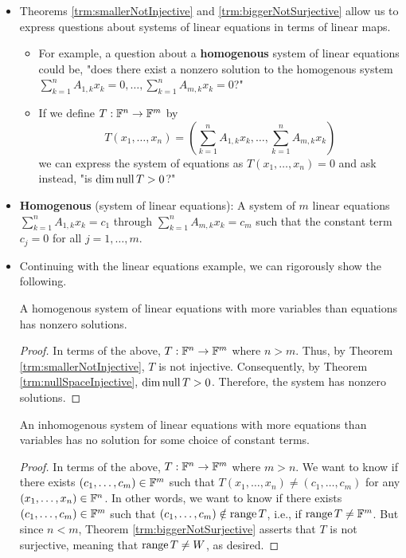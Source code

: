 \documentclass[../main.tex]{subfiles}
\begin{document}
\begin{itemize}
\begin{theorem}
\begin{proof}
        \end{proof}
    \end{theorem}
    \item Theorems \ref{trm:smallerNotInjective} and \ref{trm:biggerNotSurjective} allow us to express questions about systems of linear equations in terms of linear maps.
    \begin{itemize}
        \item For example, a question about a \textbf{homogenous} system of linear equations could be, "does there exist a nonzero solution to the homogenous system $\sum_{k=1}^nA_{1,k}x_k=0,\dots,\sum_{k=1}^nA_{m,k}x_k=0$?"
        \item If we define $T:\mathbb{F}^n\to\mathbb{F}^m$ by
        \begin{equation*}
            T(x_1,\dots,x_n) = \left( \sum_{k=1}^nA_{1,k}x_k,\dots,\sum_{k=1}^nA_{m,k}x_k \right)
        \end{equation*}
        we can express the system of equations as $T(x_1,\dots,x_n)=0$ and ask instead, "is $\dim\operatorname{null} T>0$?"
    \end{itemize}
    \item \textbf{Homogenous} (system of linear equations): A system of $m$ linear equations $\sum_{k=1}^nA_{1,k}x_k=c_1$ through $\sum_{k=1}^nA_{m,k}x_k=c_m$ such that the constant term $c_j=0$ for all $j=1,\dots,m$.
    \item Continuing with the linear equations example, we can rigorously show the following.
    \begin{theorem}
        A homogenous system of linear equations with more variables than equations has nonzero solutions.
        \begin{proof}
            In terms of the above, $T:\mathbb{F}^n\to\mathbb{F}^m$ where $n>m$. Thus, by Theorem \ref{trm:smallerNotInjective}, $T$ is not injective. Consequently, by Theorem \ref{trm:nullSpaceInjective}, $\dim\operatorname{null} T>0$. Therefore, the system has nonzero solutions.
        \end{proof}
    \end{theorem}
    \begin{theorem}
        An inhomogenous system of linear equations with more equations than variables has no solution for some choice of constant terms.
        \begin{proof}
            In terms of the above, $T:\mathbb{F}^n\to\mathbb{F}^m$ where $m>n$. We want to know if there exists $(c_1,\dots,c_m)\in\mathbb{F}^m$ such that $T(x_1,\dots,x_n)\neq(c_1,\dots,c_m)$ for any $(x_1,\dots,x_n)\in\mathbb{F}^n$. In other words, we want to know if there exists $(c_1,\dots,c_m)\in\mathbb{F}^m$ such that $(c_1,\dots,c_m)\notin\operatorname{range} T$, i.e., if $\operatorname{range} T\neq\mathbb{F}^m$. But since $n<m$, Theorem \ref{trm:biggerNotSurjective} asserts that $T$ is not surjective, meaning that $\operatorname{range} T\neq W$, as desired.

\end{proof}
\end{theorem}
\end{itemize}
\end{document}
